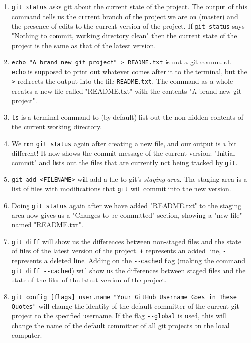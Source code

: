 \documentclass[11pt,fleqn]{article}
\theoremstyle{definition}
\begin{document}
\begin{enumerate}
\item \verb|git status| asks git about the current state of the project. The output of this command tells us the current branch of the project we are on (master) and the presence of edits to the current version of the project. If \verb|git status| says "Nothing to commit, working directory clean" then the current state of the project is the same as that of the latest version.
\newpage

\item \verb|echo "A brand new git project" > README.txt| is not a git command. \verb|echo| is supposed to print out whatever comes after it to the terminal, but the \verb|>| redirects the output into the file \verb|README.txt|. The command as a whole creates a new file called "README.txt" with the contents "A brand new git project".
\item \verb|ls| is a terminal command to (by default) list out the non-hidden contents of the current working directory.
\item We run \verb|git status| again after creating a new file, and our output is a bit different! It now shows the commit message of the current version: "Initial commit" and lists out the files that are currently not being tracked by \verb|git|.
\item \verb|git add <FILENAME>| will add a file to git's \textit{staging area}. The staging area is a list of files with modifications that \verb|git| will commit into the new version.
\item Doing \verb|git status| again after we have added "README.txt" to the staging area now gives us a "Changes to be committed" section, showing a "new file" named "README.txt".
\item \verb|git diff| will show us the differences between non-staged files and the state of files of the latest version of the project. \verb|+| represents an added line, \verb|-| represents a deleted line. Adding on the \verb|--cached| flag (making the command \verb|git diff --cached|) will show us the differences between staged files and the state of the files of the latest version of the project.
\item \verb|git config [flags] user.name "Your GitHub Username Goes in These Quotes"| will change the identity of the default committer of the current git project to the specified username. If the flag \verb|--global| is used, this will change the name of the default committer of all git projects on the local computer.

\end{enumerate}
\end{document}
